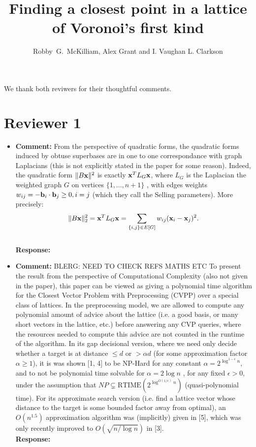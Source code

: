 \documentclass[a4paper,10pt]{article}
\title{Finding a closest point in a lattice of Voronoi's first kind}
\author{Robby~G.~McKilliam, Alex Grant and I. Vaughan L. Clarkson
}
\begin{document}
\maketitle

We thank both reviwers for their thoughtful comments.  %


\section*{Reviewer 1}\label{sec:reviewer-1}

\begin{itemize}

\item\textbf{Comment:} 
From the perspective of quadratic forms, the quadratic forms induced by obtuse superbases are in one to one correspondance with graph Laplacians (this is not
explicitly stated in the paper for some reason). Indeed, the quadratic form $\|B\mathbf{x}\|^2$ is exactly $\mathbf{x}^T L_G \mathbf{x}$, where $L_G$ is the Laplacian the weighted graph $G$ on vertices $\{ 1, . . . , n + 1 \}$ , with edges weights $w_{ij} = -\mathbf{b}_i \cdot \mathbf{b}_j \geq 0, i = j$ (which they call the Selling parameters). More precisely:
\[
\|B\mathbf{x}\|_2^2 = \mathbf{x}^T L_G \mathbf{x} = \sum_{ \{i,j\} \in E[G] } w_{ij} (\mathbf{x}_{i} - \mathbf{x}_{j} )^2.
\]
\\ \textbf{Response:}

\item\textbf{Comment:} 
BLERG: NEED TO CHECK REFS MATHS ETC To present the result from the perspective of Computational Complexity (also not given in the
paper), this paper can be viewed as giving a polynomial time algorithm for the Closest Vector
Problem with Preprocessing (CVPP) over a special class of lattices. In the preprocessing model,
we are allowed to compute any polynomial amount of advice about the lattice (i.e. a good basis, or many short vectors in the lattice, etc.) before answering any CVP queries, where the resources needed to compute this advice are not counted in the runtime of the algorithm. In its
gap decisional version, where we need only decide whether a target is at distance $\leq d$ or $> \alpha d$
(for some approximation factor $\alpha \geq 1$), it is was shown [1, 4] to be NP-Hard for any constant $\alpha = 2^{\log^{1-\epsilon}n}$, and to not be polynomial time solvable for $\alpha = 2 \log n$ , for any fixed $\epsilon > 0$, under the assumption  that $NP \subsetneq \text{RTIME}(2^{\log^{O(1/\epsilon)}n})$ (quasi-polynomial time). For its approximate search version (i.e. find a lattice vector whose distance to the target is some bounded factor away from optimal), an $O(n^{1.5})$ approximation algorithm was (implicitly) given in [5], which was only recently improved to $O( \sqrt{ n / \log n} )$ in [3].
\\\textbf{Response:}


\end{itemize}
\end{document}
